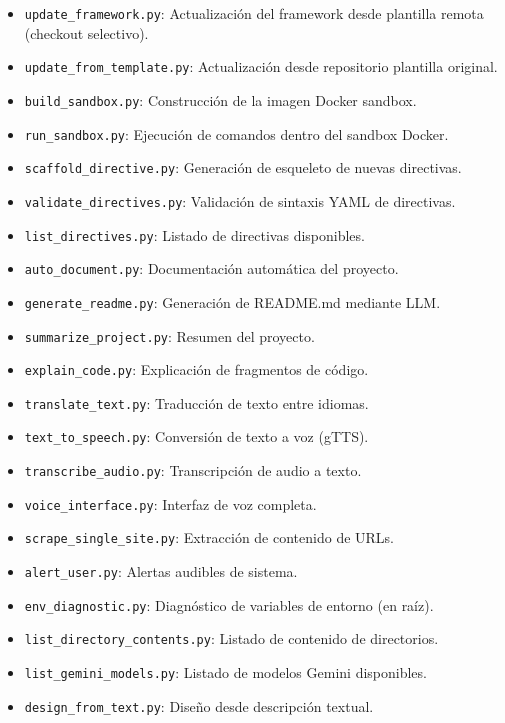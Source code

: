 \documentclass[12pt, a4paper]{article}
\begin{document}
\begin{itemize}[leftmargin=*]
    \item \texttt{update\_framework.py}: Actualización del framework desde plantilla remota (checkout selectivo).
    \item \texttt{update\_from\_template.py}: Actualización desde repositorio plantilla original.
    \item \texttt{build\_sandbox.py}: Construcción de la imagen Docker sandbox.
    \item \texttt{run\_sandbox.py}: Ejecución de comandos dentro del sandbox Docker.
    \item \texttt{scaffold\_directive.py}: Generación de esqueleto de nuevas directivas.
    \item \texttt{validate\_directives.py}: Validación de sintaxis YAML de directivas.
    \item \texttt{list\_directives.py}: Listado de directivas disponibles.
    \item \texttt{auto\_document.py}: Documentación automática del proyecto.
    \item \texttt{generate\_readme.py}: Generación de README.md mediante LLM.
    \item \texttt{summarize\_project.py}: Resumen del proyecto.
    \item \texttt{explain\_code.py}: Explicación de fragmentos de código.
    \item \texttt{translate\_text.py}: Traducción de texto entre idiomas.
    \item \texttt{text\_to\_speech.py}: Conversión de texto a voz (gTTS).
    \item \texttt{transcribe\_audio.py}: Transcripción de audio a texto.
    \item \texttt{voice\_interface.py}: Interfaz de voz completa.
    \item \texttt{scrape\_single\_site.py}: Extracción de contenido de URLs.
    \item \texttt{alert\_user.py}: Alertas audibles de sistema.
    \item \texttt{env\_diagnostic.py}: Diagnóstico de variables de entorno (en raíz).
    \item \texttt{list\_directory\_contents.py}: Listado de contenido de directorios.
    \item \texttt{list\_gemini\_models.py}: Listado de modelos Gemini disponibles.
    \item \texttt{design\_from\_text.py}: Diseño desde descripción textual.
\end{itemize}
\end{document}
